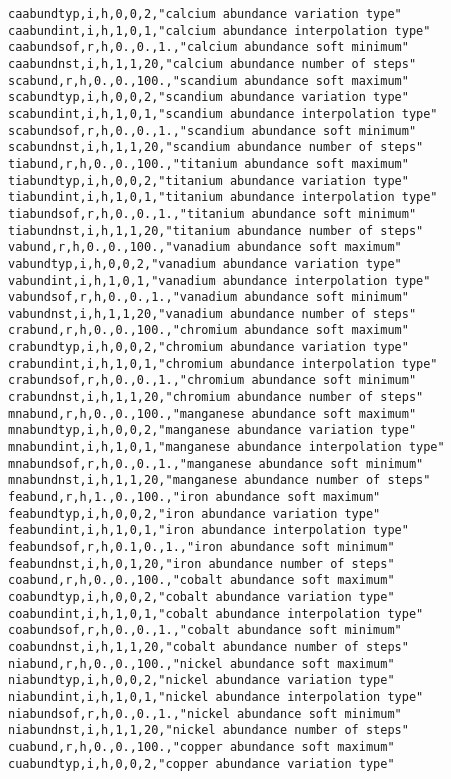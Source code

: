 \begin{verbatim}
caabundtyp,i,h,0,0,2,"calcium abundance variation type"
caabundint,i,h,1,0,1,"calcium abundance interpolation type"
caabundsof,r,h,0.,0.,1.,"calcium abundance soft minimum"
caabundnst,i,h,1,1,20,"calcium abundance number of steps"
scabund,r,h,0.,0.,100.,"scandium abundance soft maximum"
scabundtyp,i,h,0,0,2,"scandium abundance variation type"
scabundint,i,h,1,0,1,"scandium abundance interpolation type"
scabundsof,r,h,0.,0.,1.,"scandium abundance soft minimum"
scabundnst,i,h,1,1,20,"scandium abundance number of steps"
tiabund,r,h,0.,0.,100.,"titanium abundance soft maximum"
tiabundtyp,i,h,0,0,2,"titanium abundance variation type"
tiabundint,i,h,1,0,1,"titanium abundance interpolation type"
tiabundsof,r,h,0.,0.,1.,"titanium abundance soft minimum"
tiabundnst,i,h,1,1,20,"titanium abundance number of steps"
vabund,r,h,0.,0.,100.,"vanadium abundance soft maximum"
vabundtyp,i,h,0,0,2,"vanadium abundance variation type"
vabundint,i,h,1,0,1,"vanadium abundance interpolation type"
vabundsof,r,h,0.,0.,1.,"vanadium abundance soft minimum"
vabundnst,i,h,1,1,20,"vanadium abundance number of steps"
crabund,r,h,0.,0.,100.,"chromium abundance soft maximum"
crabundtyp,i,h,0,0,2,"chromium abundance variation type"
crabundint,i,h,1,0,1,"chromium abundance interpolation type"
crabundsof,r,h,0.,0.,1.,"chromium abundance soft minimum"
crabundnst,i,h,1,1,20,"chromium abundance number of steps"
mnabund,r,h,0.,0.,100.,"manganese abundance soft maximum"
mnabundtyp,i,h,0,0,2,"manganese abundance variation type"
mnabundint,i,h,1,0,1,"manganese abundance interpolation type"
mnabundsof,r,h,0.,0.,1.,"manganese abundance soft minimum"
mnabundnst,i,h,1,1,20,"manganese abundance number of steps"
feabund,r,h,1.,0.,100.,"iron abundance soft maximum"
feabundtyp,i,h,0,0,2,"iron abundance variation type"
feabundint,i,h,1,0,1,"iron abundance interpolation type"
feabundsof,r,h,0.1,0.,1.,"iron abundance soft minimum"
feabundnst,i,h,0,1,20,"iron abundance number of steps"
coabund,r,h,0.,0.,100.,"cobalt abundance soft maximum"
coabundtyp,i,h,0,0,2,"cobalt abundance variation type"
coabundint,i,h,1,0,1,"cobalt abundance interpolation type"
coabundsof,r,h,0.,0.,1.,"cobalt abundance soft minimum"
coabundnst,i,h,1,1,20,"cobalt abundance number of steps"
niabund,r,h,0.,0.,100.,"nickel abundance soft maximum"
niabundtyp,i,h,0,0,2,"nickel abundance variation type"
niabundint,i,h,1,0,1,"nickel abundance interpolation type"
niabundsof,r,h,0.,0.,1.,"nickel abundance soft minimum"
niabundnst,i,h,1,1,20,"nickel abundance number of steps"
cuabund,r,h,0.,0.,100.,"copper abundance soft maximum"
cuabundtyp,i,h,0,0,2,"copper abundance variation type"

\end{verbatim}
